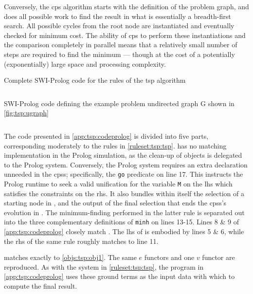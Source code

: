 Conversely, the \gls{cps} algorithm starts with the definition of the problem graph, and does all possible work to find the result in what is essentially a breadth-first search.  All possible cycles from the root node are instantiated and eventually checked for minimum cost. The ability of \gls{cps} to perform these instantiations and the comparison completely in parallel means that a relatively small number of steps are required to find the minimum --- though at the cost of a potentially (exponentially) large space and processing complexity.

\begin{listing}
\caption[Complete SWI-Prolog code for the  algorithm]{\label{app:tsp:codeprolog}Complete SWI-Prolog code for the rules of the \gls{tsp} algorithm}
\inputminted[linenos,breaklines,frame=lines,autogobble,firstline=5]{prolog}{chapters/tsp/code/tsp.pl.txt}
\end{listing}

\begin{listing}
\caption{\label{app:tsp:probprolog}SWI-Prolog code defining the example problem undirected graph G shown in \cref{fig:tsp:ugraph}}
\inputminted[linenos,breaklines,frame=lines,autogobble,lastline=3]{prolog}{chapters/tsp/code/tsp.pl.txt}
\end{listing}

The code presented in \cref{app:tsp:codeprolog} is divided into five parts, corresponding moderately to the rules in \cref{ruleset:tsp:tsp}.   has no matching implementation in the Prolog simulation, as the clean-up of objects is delegated to the Prolog system.  Conversely, the Prolog system requires an extra declaration unneeded in the \glspl{cps}; specifically, the \texttt{go} predicate on line 17.  This instructs the Prolog runtime to seek a valid unification for the variable \texttt{M} on the \gls{lhs} which satisfies the constraints on the \gls{rhs}.  It also bundles within itself the selection of a starting node in , and the output of the final selection that ends the \glspl{cps}'s evolution in .  The minimum-finding performed in the latter rule is separated out into the three complementary definitions of \texttt{minh} on lines 13-15.  Lines 8 \& 9 of \cref{app:tsp:codeprolog} closely match .  The \gls{lhs} of  is embodied by lines 5 \& 6, while the \gls{rhs} of the same rule roughly matches to line 11.



 matches exactly to \cref{objs:tsp:obj1}.  The same \(e\) \glspl{functor} and one \(v\) \gls{functor} are reproduced.  As with the system in \cref{ruleset:tsp:tsp}, the program in \cref{app:tsp:codeprolog} uses these ground terms as the input data with which to compute the final result.